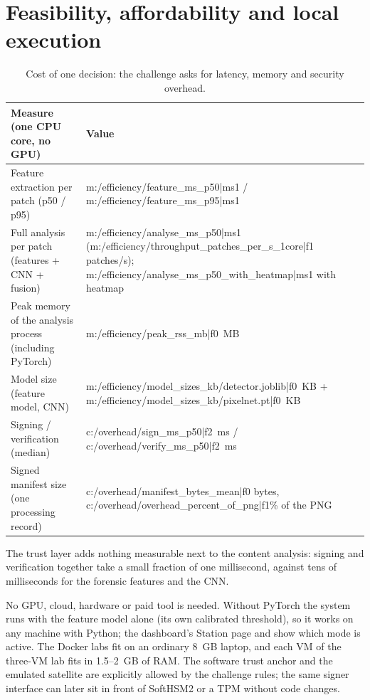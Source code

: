\section{Feasibility, affordability and local execution}\label{sec:feas}

\begin{table}[!htbp]
\centering\small
\begin{tabularx}{\textwidth}{|Y|L{6.2cm}|}
\hline
\textbf{Measure (one CPU core, no GPU)} & \textbf{Value}\\
\hline
Feature extraction per patch (p50 / p95) & {{m:/efficiency/feature_ms_p50|ms1}} / {{m:/efficiency/feature_ms_p95|ms1}}\\
\hline
Full analysis per patch (features + CNN + fusion) & {{m:/efficiency/analyse_ms_p50|ms1}} ({{m:/efficiency/throughput_patches_per_s_1core|f1}} patches/s); {{m:/efficiency/analyse_ms_p50_with_heatmap|ms1}} with heatmap\\
\hline
Peak memory of the analysis process (including PyTorch) & {{m:/efficiency/peak_rss_mb|f0}}~MB\\
\hline
Model size (feature model, CNN) & {{m:/efficiency/model_sizes_kb/detector.joblib|f0}}~KB + {{m:/efficiency/model_sizes_kb/pixelnet.pt|f0}}~KB\\
\hline
Signing / verification (median) & {{c:/overhead/sign_ms_p50|f2}}~ms / {{c:/overhead/verify_ms_p50|f2}}~ms\\
\hline
Signed manifest size (one processing record) & {{c:/overhead/manifest_bytes_mean|f0}} bytes, {{c:/overhead/overhead_percent_of_png|f1}}\% of the PNG\\
\hline
\end{tabularx}
\caption{Cost of one decision: the challenge asks for latency, memory and security overhead.}
\end{table}

The trust layer adds nothing measurable next to the content analysis: signing and verification together take a small fraction of one millisecond, against tens of milliseconds for the forensic features and the CNN.

No GPU, cloud, hardware or paid tool is needed. Without PyTorch the system runs with the feature model alone (its own calibrated threshold), so it works on any machine with Python; the dashboard's Station page and  show which mode is active. The Docker labs fit on an ordinary 8~GB laptop, and each VM of the three-VM lab fits in 1.5--2~GB of RAM. The software trust anchor and the emulated satellite are explicitly allowed by the challenge rules; the same signer interface can later sit in front of SoftHSM2 or a TPM without code changes.
